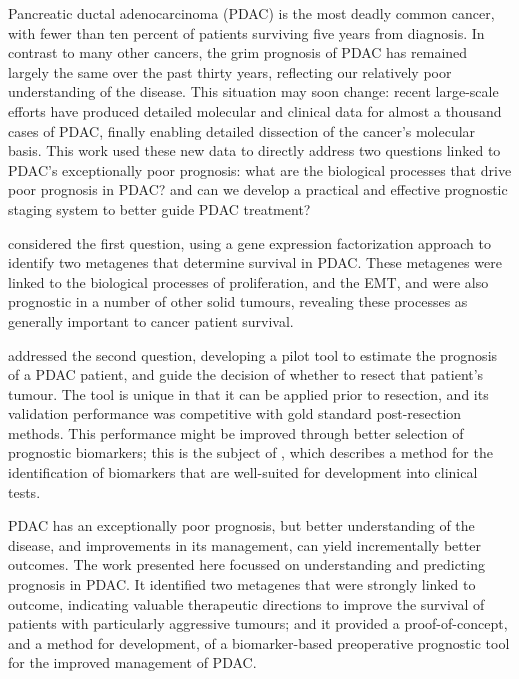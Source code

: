 \noindent Pancreatic ductal adenocarcinoma (PDAC) is the most deadly common cancer, with fewer than ten percent of patients surviving five years from diagnosis.  In contrast to many other cancers, the grim prognosis of PDAC has remained largely the same over the past thirty years, reflecting our relatively poor understanding of the disease.  This situation may soon change: recent large-scale efforts have produced detailed molecular and clinical data for almost a thousand cases of PDAC, finally enabling detailed dissection of the cancer's molecular basis.  This work used these new data to directly address two questions linked to PDAC's exceptionally poor prognosis: what are the biological processes that drive poor prognosis in PDAC? and can we develop a practical and effective prognostic staging system to better guide PDAC treatment?
\par
{} considered the first question, using a gene expression factorization approach to identify two metagenes that determine survival in PDAC.  These metagenes were linked to the biological processes of proliferation, and the EMT, and were also prognostic in a number of other solid tumours, revealing these processes as generally important to cancer patient survival.  
\par
{} addressed the second question, developing a pilot tool to estimate the prognosis of a PDAC patient, and guide the decision of whether to resect that patient's tumour.  The tool is unique in that it can be applied prior to resection, and its validation performance was competitive with gold standard post-resection methods.  This performance might be improved through better selection of prognostic biomarkers; this is the subject of , which describes a method for the identification of biomarkers that are well-suited for development into clinical tests.
\par
PDAC has an exceptionally poor prognosis, but better understanding of the disease, and improvements in its management, can yield incrementally better outcomes.  The work presented here focussed on understanding and predicting prognosis in PDAC.  It identified two metagenes that were strongly linked to outcome, indicating valuable therapeutic directions to improve the survival of patients with particularly aggressive tumours; and it provided a proof-of-concept, and a method for development, of a biomarker-based preoperative prognostic tool for the improved management of PDAC.
